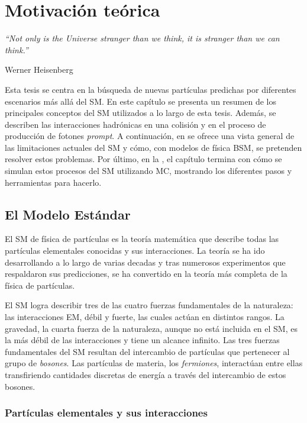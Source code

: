 \chapter{Motivación teórica}
\label{ch:theory}
\epigraph{\emph{\enquote{Not only is the Universe stranger than we think, it is stranger than we can think.}}}{Werner Heisenberg}


Esta tesis se centra en la búsqueda de nuevas partículas predichas por diferentes escenarios más allá del \ac{SM}. En este capítulo se presenta un resumen de los principales conceptos del \ac{SM} utilizados a lo largo de esta tesis. Además, se describen las interacciones hadrónicas en una colisión \pp y en el proceso de producción de fotones \textit{prompt}.
A continuación, en \Sect{\ref{sec:theory:bsm}} se ofrece una vista general de las limitaciones actuales del \ac{SM} y cómo, con modelos de física \ac{BSM}, se pretenden resolver estos problemas.
Por último, en la \Sect{\ref{sec:theory:mc_simulation}}, el capítulo termina con cómo se simulan estos procesos del \ac{SM} utilizando \ac{MC}, mostrando los diferentes pasos y herramientas para hacerlo.




\section{El Modelo Estándar}
\label{sec:theory:sm}

El \acf{SM} de física de partículas es la teoría matemática que describe todas las partículas elementales conocidas y sus interacciones.
La teoría se ha ido desarrollando a lo largo de varias decadas y tras numerosos experimentos que respaldaron sus predicciones, se ha convertido en la teoría más completa de la física de partículas.

El \ac{SM} logra describir tres de las cuatro fuerzas fundamentales de la naturaleza: las interacciones \ac{EM}, débil y fuerte, las cuales actúan en distintos rangos.
La gravedad, la cuarta fuerza de la naturaleza, aunque no está incluida en el \ac{SM}, es la más débil de las interacciones y tiene un alcance infinito.
Las tres fuerzas fundamentales del \ac{SM} resultan del intercambio de partículas que pertenecer al grupo de \textit{bosones}. Las partículas de materia, los \textit{fermiones}, interactúan entre ellas transfiriendo cantidades discretas de energía a través del intercambio de estos bosones.



\subsection{Partículas elementales y sus interacciones}
\label{subsec:theory:sm:particles_interaction}


